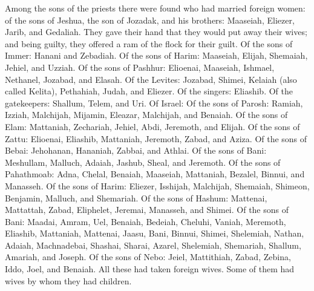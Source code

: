  Among the sons of the priests there were found who had
married foreign women: of the sons of Jeshua, the son of Jozadak, and
his brothers: Maaseiah, Eliezer, Jarib, and Gedaliah. 
They gave their hand that they would put away their wives; and being
guilty, they offered a ram of the flock for their guilt. 
Of the sons of Immer: Hanani and Zebadiah.  Of the sons
of Harim: Maaseiah, Elijah, Shemaiah, Jehiel, and Uzziah.
 Of the sons of Pashhur: Elioenai, Maaseiah, Ishmael,
Nethanel, Jozabad, and Elasah.  Of the Levites: Jozabad,
Shimei, Kelaiah (also called Kelita), Pethahiah, Judah, and Eliezer.
 Of the singers: Eliashib. Of the gatekeepers: Shallum,
Telem, and Uri.  Of Israel: Of the sons of Parosh:
Ramiah, Izziah, Malchijah, Mijamin, Eleazar, Malchijah, and Benaiah.
 Of the sons of Elam: Mattaniah, Zechariah, Jehiel, Abdi,
Jeremoth, and Elijah.  Of the sons of Zattu: Elioenai,
Eliashib, Mattaniah, Jeremoth, Zabad, and Aziza.  Of the
sons of Bebai: Jehohanan, Hananiah, Zabbai, and Athlai. 
Of the sons of Bani: Meshullam, Malluch, Adaiah, Jashub, Sheal, and
Jeremoth.  Of the sons of Pahathmoab: Adna, Chelal,
Benaiah, Maaseiah, Mattaniah, Bezalel, Binnui, and Manasseh.
 Of the sons of Harim: Eliezer, Isshijah, Malchijah,
Shemaiah, Shimeon,  Benjamin, Malluch, and Shemariah.
 Of the sons of Hashum: Mattenai, Mattattah, Zabad,
Eliphelet, Jeremai, Manasseh, and Shimei.  Of the sons of
Bani: Maadai, Amram, Uel,  Benaiah, Bedeiah, Cheluhi,
 Vaniah, Meremoth, Eliashib,  Mattaniah,
Mattenai, Jaasu,  Bani, Binnui, Shimei, 
Shelemiah, Nathan, Adaiah,  Machnadebai, Shashai, Sharai,
 Azarel, Shelemiah, Shemariah,  Shallum,
Amariah, and Joseph.  Of the sons of Nebo: Jeiel,
Mattithiah, Zabad, Zebina, Iddo, Joel, and Benaiah.  All
these had taken foreign wives. Some of them had wives by whom they had
children.
